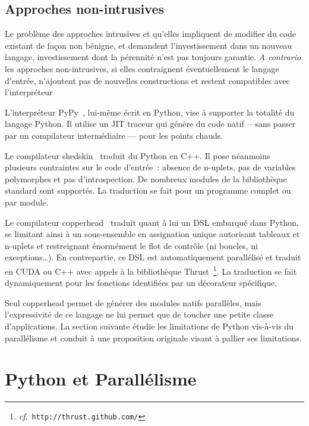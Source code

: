 \documentclass[renpar]{compas2013}
\begin{document}
\subsection{Approches non-intrusives}

Le problème des approches intrusives et qu'elles impliquent de modifier du
code existant de façon non bénigne, et demandent l'investissement dans un
nouveau langage, investissement dont la pérennité n'est pas toujours
garantie. \emph{A contrario} les approches non-intrusives, si elles
contraignent éventuellement le langage d'entrée, n'ajoutent pas de
nouvelles constructions et restent compatibles avec l'interpréteur 

L'interpréteur PyPy~\cite{pypy2009}, lui-même écrit en Python, vise à
supporter la totalité du langage Python. Il utilise un JIT traceur qui
génère du code natif ---sans passer par un compilateur intermédiaire ---
pour les points chauds.

Le compilateur shedskin~\cite{shedskin2006} traduit du Python en C++. Il
pose néanmoins plusieurs contraintes sur le code d'entrée~: absence de
n-uplets, pas de variables polymorphes et pas d'introspection. De nombreux
modules de la bibliothèque standard sont supportés. La traduction se fait
pour un programme complet ou par module.

Le compilateur copperhead~\cite{copperhead2011} traduit quant à lui un DSL
embarqué dans Python, se limitant ainsi à un sous-ensemble en assignation
unique autorisant tableaux et n-uplets et restreignant énormément le flot
de contrôle (ni boucles, ni exceptions\dots). En contrepartie, ce DSL est
automatiquement parallélisé et traduit en CUDA ou C++ avec appels à la
bibliothèque Thrust~\footnote{\emph{cf}.\
\texttt{http://thrust.github.com/}}. La traduction se fait dynamiquement
pour les fonctions identifiées par un décorateur spécifique.

Seul copperhead permet de générer des modules natifs parallèles, mais
l'expressivité de ce langage ne lui permet que de toucher une petite
classe d'applications. La section suivante étudie les limitations de
Python vis-à-vis du parallélisme et conduit à une proposition originale
visant à pallier ses limitations.

\section{Python et Parallélisme}\label{sec:python-parallelism}
\end{document}

